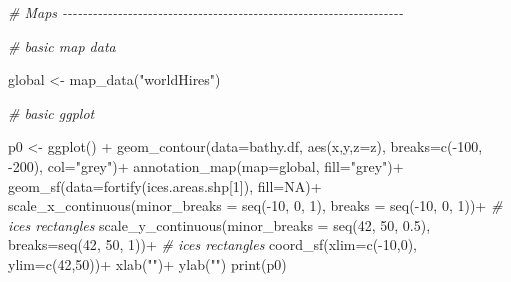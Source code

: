 \documentclass[
]{book}
\newenvironment{Shaded}{\begin{snugshade}}{\end{snugshade}}
\newcommand{\AttributeTok}[1]{\textcolor[rgb]{0.77,0.63,0.00}{#1}}
\newcommand{\CommentTok}[1]{\textcolor[rgb]{0.56,0.35,0.01}{\textit{#1}}}
\newcommand{\ConstantTok}[1]{\textcolor[rgb]{0.00,0.00,0.00}{#1}}
\newcommand{\DecValTok}[1]{\textcolor[rgb]{0.00,0.00,0.81}{#1}}
\newcommand{\FloatTok}[1]{\textcolor[rgb]{0.00,0.00,0.81}{#1}}
\newcommand{\FunctionTok}[1]{\textcolor[rgb]{0.00,0.00,0.00}{#1}}
\newcommand{\NormalTok}[1]{#1}
\newcommand{\OtherTok}[1]{\textcolor[rgb]{0.56,0.35,0.01}{#1}}
\newcommand{\SpecialCharTok}[1]{\textcolor[rgb]{0.00,0.00,0.00}{#1}}
\newcommand{\StringTok}[1]{\textcolor[rgb]{0.31,0.60,0.02}{#1}}
\begin{document}
\begin{Shaded}
\begin{Highlighting}[]
\CommentTok{\# Maps {-}{-}{-}{-}{-}{-}{-}{-}{-}{-}{-}{-}{-}{-}{-}{-}{-}{-}{-}{-}{-}{-}{-}{-}{-}{-}{-}{-}{-}{-}{-}{-}{-}{-}{-}{-}{-}{-}{-}{-}{-}{-}{-}{-}{-}{-}{-}{-}{-}{-}{-}{-}{-}{-}{-}{-}{-}{-}{-}{-}{-}{-}{-}{-}{-}{-}{-}{-}}

\CommentTok{\# basic map data}

\NormalTok{global }\OtherTok{\textless{}{-}} \FunctionTok{map\_data}\NormalTok{(}\StringTok{"worldHires"}\NormalTok{)}

\CommentTok{\# basic ggplot}

\NormalTok{p0 }\OtherTok{\textless{}{-}} \FunctionTok{ggplot}\NormalTok{() }\SpecialCharTok{+} 
  \FunctionTok{geom\_contour}\NormalTok{(}\AttributeTok{data=}\NormalTok{bathy.df, }\FunctionTok{aes}\NormalTok{(x,y,}\AttributeTok{z=}\NormalTok{z), }\AttributeTok{breaks=}\FunctionTok{c}\NormalTok{(}\SpecialCharTok{{-}}\DecValTok{100}\NormalTok{, }\SpecialCharTok{{-}}\DecValTok{200}\NormalTok{), }\AttributeTok{col=}\StringTok{"grey"}\NormalTok{)}\SpecialCharTok{+}
  \FunctionTok{annotation\_map}\NormalTok{(}\AttributeTok{map=}\NormalTok{global, }\AttributeTok{fill=}\StringTok{"grey"}\NormalTok{)}\SpecialCharTok{+}
  \FunctionTok{geom\_sf}\NormalTok{(}\AttributeTok{data=}\FunctionTok{fortify}\NormalTok{(ices.areas.shp[}\DecValTok{1}\NormalTok{]), }\AttributeTok{fill=}\ConstantTok{NA}\NormalTok{)}\SpecialCharTok{+}
  \FunctionTok{scale\_x\_continuous}\NormalTok{(}\AttributeTok{minor\_breaks =} \FunctionTok{seq}\NormalTok{(}\SpecialCharTok{{-}}\DecValTok{10}\NormalTok{, }\DecValTok{0}\NormalTok{, }\DecValTok{1}\NormalTok{), }\AttributeTok{breaks =} \FunctionTok{seq}\NormalTok{(}\SpecialCharTok{{-}}\DecValTok{10}\NormalTok{, }\DecValTok{0}\NormalTok{, }\DecValTok{1}\NormalTok{))}\SpecialCharTok{+}   \CommentTok{\# ices rectangles}
  \FunctionTok{scale\_y\_continuous}\NormalTok{(}\AttributeTok{minor\_breaks =} \FunctionTok{seq}\NormalTok{(}\DecValTok{42}\NormalTok{, }\DecValTok{50}\NormalTok{, }\FloatTok{0.5}\NormalTok{), }\AttributeTok{breaks=}\FunctionTok{seq}\NormalTok{(}\DecValTok{42}\NormalTok{, }\DecValTok{50}\NormalTok{, }\DecValTok{1}\NormalTok{))}\SpecialCharTok{+}   \CommentTok{\# ices rectangles}
  \FunctionTok{coord\_sf}\NormalTok{(}\AttributeTok{xlim=}\FunctionTok{c}\NormalTok{(}\SpecialCharTok{{-}}\DecValTok{10}\NormalTok{,}\DecValTok{0}\NormalTok{), }\AttributeTok{ylim=}\FunctionTok{c}\NormalTok{(}\DecValTok{42}\NormalTok{,}\DecValTok{50}\NormalTok{))}\SpecialCharTok{+}
  \FunctionTok{xlab}\NormalTok{(}\StringTok{""}\NormalTok{)}\SpecialCharTok{+}
  \FunctionTok{ylab}\NormalTok{(}\StringTok{""}\NormalTok{)}
\FunctionTok{print}\NormalTok{(p0)}


\end{Highlighting}
\end{Shaded}
\end{document}
